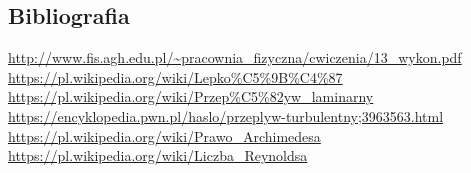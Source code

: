 \documentclass[a4paper,12pt]{article}
\begin{document}
\begin{justify}
\section{Bibliografia}

\begingroup
\renewcommand{\section}[2]{}%
\begin{thebibliography}{}
 \url{http://www.fis.agh.edu.pl/~pracownia_fizyczna/cwiczenia/13_wykon.pdf}
 \url{https://pl.wikipedia.org/wiki/Lepko%C5%9B%C4%87}
 \url{https://pl.wikipedia.org/wiki/Przep%C5%82yw_laminarny}
 \url{https://encyklopedia.pwn.pl/haslo/przeplyw-turbulentny;3963563.html}
 \url{https://pl.wikipedia.org/wiki/Prawo_Archimedesa}
 \url{https://pl.wikipedia.org/wiki/Liczba_Reynoldsa}
\end{thebibliography}
\endgroup

\end{justify}
\end{document}

